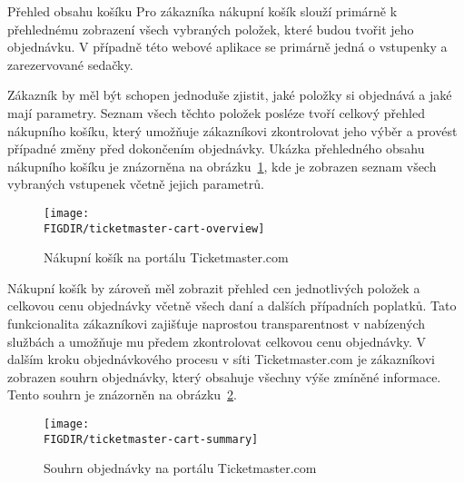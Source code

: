 \begin{subsection}{Přehled obsahu košíku}
    \label{subsec:identifikace-nakupni-kosik-prehled}
    Pro zákazníka nákupní košík slouží primárně k přehlednému zobrazení všech vybraných položek, které budou tvořit jeho objednávku.
    V případně této webové aplikace se primárně jedná o vstupenky a zarezervované sedačky.

    Zákazník by měl být schopen jednoduše zjistit, jaké položky si objednává a jaké mají parametry.
    Seznam všech těchto položek posléze tvoří celkový přehled nákupního košíku, který umožňuje zákazníkovi zkontrolovat jeho výběr a provést případné změny před dokončením objednávky.
    Ukázka přehledného obsahu nákupního košíku je znázorněna na obrázku~\ref{fig:ticketmaster-cart-overview}, kde je zobrazen seznam všech vybraných vstupenek včetně jejich parametrů.

    \begin{figure}[H]
        \texttt{[image: \\FIGDIR/ticketmaster-cart-overview]}
        \centering
        \caption{Nákupní košík na portálu Ticketmaster.com\cite{t__www_ticketmaster_com}}
        \label{fig:ticketmaster-cart-overview}
    \end{figure}

    Nákupní košík by zároveň měl zobrazit přehled cen jednotlivých položek a celkovou cenu objednávky včetně všech daní a dalších případních poplatků.
    Tato funkcionalita zákazníkovi zajišťuje naprostou transparentnost v nabízených službách a umožňuje mu předem zkontrolovat celkovou cenu objednávky.
    V dalším kroku objednávkového procesu v síti Ticketmaster.com je zákazníkovi zobrazen souhrn objednávky, který obsahuje všechny výše zmíněné informace.
    Tento souhrn je znázorněn na obrázku~\ref{fig:ticketmaster-cart-summary}.

    \begin{figure}[H]
        \texttt{[image: \\FIGDIR/ticketmaster-cart-summary]}
        \centering
        \caption{Souhrn objednávky na portálu Ticketmaster.com\cite{t__www_ticketmaster_com}}
        \label{fig:ticketmaster-cart-summary}
    \end{figure}
\end{subsection}

